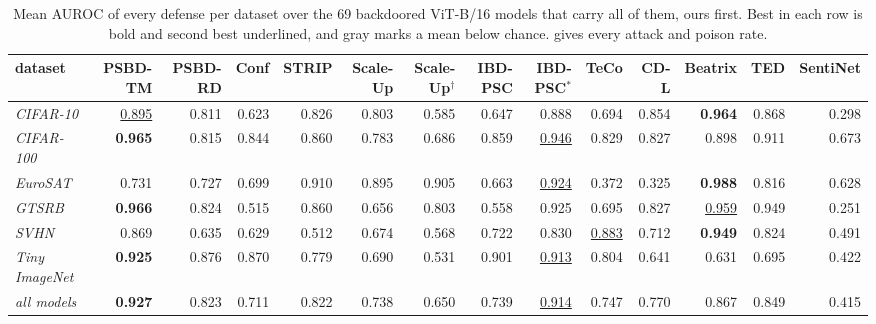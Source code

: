 \begin{table}[htbp]
\centering
\small
\caption{Mean AUROC of every defense per dataset over the 69 backdoored ViT-B/16 models that carry all of them, ours first. Best in each row is bold and second best underlined, and gray marks a mean below chance.  gives every attack and poison rate.}
\label{tab:detectors-summary}
\begin{adjustbox}{max width=\textwidth}
\begin{tabular}{lrrrrrrrrrrrrr}
\toprule
dataset & PSBD-TM & PSBD-RD & Conf & STRIP & Scale-Up & Scale-Up$^\dagger$ & IBD-PSC & IBD-PSC$^\ast$ & TeCo & CD-L & Beatrix & TED & SentiNet \\
\midrule
\emph{CIFAR-10} & \underline{0.895} & 0.811 & 0.623 & 0.826 & 0.803 & 0.585 & 0.647 & 0.888 & 0.694 & 0.854 & \textbf{0.964} & 0.868 & \textcolor{black!45}{0.298} \\
\emph{CIFAR-100} & \textbf{0.965} & 0.815 & 0.844 & 0.860 & 0.783 & 0.686 & 0.859 & \underline{0.946} & 0.829 & 0.827 & 0.898 & 0.911 & 0.673 \\
\emph{EuroSAT} & 0.731 & 0.727 & 0.699 & 0.910 & 0.895 & 0.905 & 0.663 & \underline{0.924} & \textcolor{black!45}{0.372} & \textcolor{black!45}{0.325} & \textbf{0.988} & 0.816 & 0.628 \\
\emph{GTSRB} & \textbf{0.966} & 0.824 & 0.515 & 0.860 & 0.656 & 0.803 & 0.558 & 0.925 & 0.695 & 0.827 & \underline{0.959} & 0.949 & \textcolor{black!45}{0.251} \\
\emph{SVHN} & 0.869 & 0.635 & 0.629 & 0.512 & 0.674 & 0.568 & 0.722 & 0.830 & \underline{0.883} & 0.712 & \textbf{0.949} & 0.824 & \textcolor{black!45}{0.491} \\
\emph{Tiny ImageNet} & \textbf{0.925} & 0.876 & 0.870 & 0.779 & 0.690 & 0.531 & 0.901 & \underline{0.913} & 0.804 & 0.641 & 0.631 & 0.695 & \textcolor{black!45}{0.422} \\
\emph{all models} & \textbf{0.927} & 0.823 & 0.711 & 0.822 & 0.738 & 0.650 & 0.739 & \underline{0.914} & 0.747 & 0.770 & 0.867 & 0.849 & \textcolor{black!45}{0.415} \\
\bottomrule
\end{tabular}
\end{adjustbox}
\end{table}
